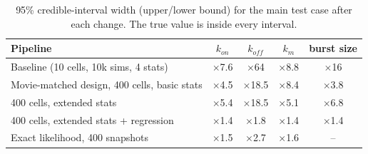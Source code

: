 \begin{table}[htbp]
\centering
\small
\begin{tabular}{lcccc}
\toprule
Pipeline & $k_{on}$ & $k_{off}$ & $k_m$ & burst size \\
\midrule
Baseline (10 cells, 10k sims, 4 stats) & $\times$7.6 & $\times$64 & $\times$8.8 & $\times$16 \\
Movie-matched design, 400 cells, basic stats & $\times$4.5 & $\times$18.5 & $\times$8.4 & $\times$3.8 \\
400 cells, extended stats & $\times$5.4 & $\times$18.5 & $\times$5.1 & $\times$6.8 \\
400 cells, extended stats + regression & $\times$1.4 & $\times$1.8 & $\times$1.4 & $\times$1.4 \\
Exact likelihood, 400 snapshots & $\times$1.5 & $\times$2.7 & $\times$1.6 & -- \\
\bottomrule
\end{tabular}
\caption{95\% credible-interval width (upper/lower bound) for the main test case after each change. The true value is inside every interval.}
\label{tab:widths}
\end{table}
